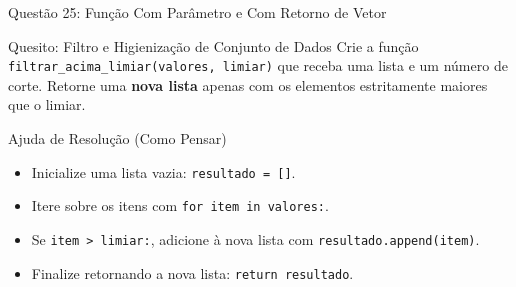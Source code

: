 \begin{frame}{Questão 25: Função Com Parâmetro e Com Retorno de Vetor}
    \begin{block}{Quesito: Filtro e Higienização de Conjunto de Dados}
        Crie a função \texttt{filtrar\_acima\_limiar(valores, limiar)} que receba uma lista e um número de corte. Retorne uma \textbf{nova lista} apenas com os elementos estritamente maiores que o limiar.
    \end{block}

    \begin{exampleblock}{Ajuda de Resolução (Como Pensar)}
        \begin{itemize}
            \item Inicialize uma lista vazia: \texttt{resultado = []}.
            \item Itere sobre os itens com \texttt{for item in valores:}.
            \item Se \texttt{item > limiar:}, adicione à nova lista com \texttt{resultado.append(item)}.
            \item Finalize retornando a nova lista: \texttt{return resultado}.
        \end{itemize}
    \end{exampleblock}
\end{frame}
